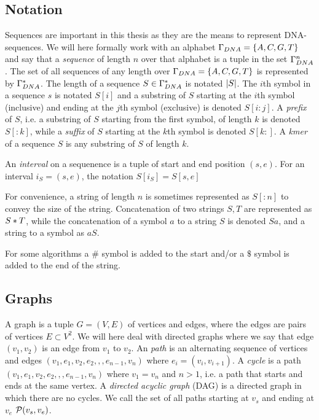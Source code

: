 \subsection{Notation}
Sequences are important in this thesis as they are the means to represent DNA-sequences. We will here formally work with an alphabet $\Gamma_{DNA} = \left\{A, C, G, T\right\}$ and say that a \emph{sequence} of length $n$ over that alphabet is a tuple in the set $\Gamma_{DNA}^n$.
The set of all sequences of any length over $\Gamma_{DNA} = \left\{A, C, G, T\right\}$ is  represented by $\Gamma_{DNA}^*$.
The length of a sequence $S \in \Gamma_{DNA}^*$ is notated $\left|S\right|$.
The $i$th symbol in a sequence $s$ is notated $S[i]$ and a substring of $S$ starting at the $i$th symbol (inclusive) and ending at the $j$th symbol (exclusive) is denoted $S[i:j]$.
A \emph{prefix} of $S$, i.e. a substring of $S$ starting from the first symbol, of length $k$ is denoted $S[:k]$, while a \emph{suffix} of $S$ starting at the $k$th symbol is denoted $S[k:]$. A \emph{kmer} of a sequence $S$ is any substring of $S$ of length $k$.

An \emph{interval} on a sequenence is a tuple of start and end position $(s, e)$. For an interval $i_S=(s, e)$, the notation $S[i_S]=S[s, e]$

For convenience, a string of length $n$ is sometimes represented as $S[:n]$ to convey the size of the string.
Concatenation of two strings $S, T$ are represented as $S * T$, while the concatenation of a symbol $a$ to a string $S$ is denoted $Sa$, and a string to a symbol as $aS$.

For some algorithms a $\#$ symbol is added to the start and/or a $\$$ symbol is added to the end of the string.

\subsection{Graphs}
A graph is a tuple $G=(V, E)$ of vertices and edges, where the edges are pairs of vertices $E \subset V^2$.
We will here deal with directed graphs where we say that edge $(v_1, v_2)$ is an edge from $v_1$ to $v_2$.
An \emph{path} is an alternating sequence of vertices and edges $(v_1, e_1, v_2, e_2,,,e_{n-1}, v_n)$ where $e_i = (v_i, v_{i+1})$.
A \emph{cycle} is a path $(v_1, e_1, v_2, e_2,,,e_{n-1}, v_n)$ where $v_1=v_n$ and $n>1$, i.e. a path that starts and ends at the same vertex.
A \emph{directed acyclic graph} (DAG) is a directed graph in which there are no cycles.
We call the set of all paths starting at $v_s$ and ending at $v_e$ $\mathcal{P}(v_s, v_e)$.

